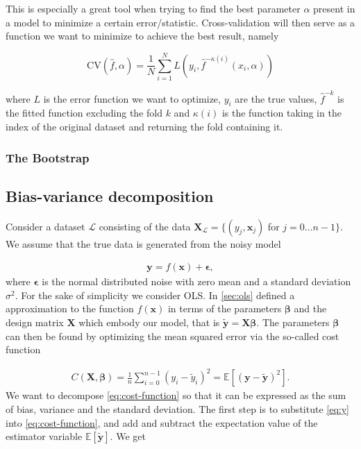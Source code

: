 This is especially a great tool when trying to find the best parameter $\alpha$ present in a model to minimize a certain error/statistic. Cross-validation will then serve as a function we want to minimize to achieve the best result, namely

\begin{equation}
  \text{CV}(\hat f, \alpha) = \frac{1}{N}\sum_{i=1}^N L\left(y_i, \hat f^{-\kappa(i)}(x_i, \alpha)\right)
\end{equation}

where $L$ is the error function we want to optimize, $y_i$ are the true values, $\hat f^{-k}$ is the fitted function excluding the fold $k$ and $\kappa(i)$ is the function taking in the index of the original dataset and returning the fold containing it. 

\subsubsection{The Bootstrap}


\subsection{Bias-variance decomposition}
Consider a dataset \ensuremath{\mathcal{L}} consisting of the data \ensuremath{\mathbf{X}_\mathcal{L}=\{(y_j, \boldsymbol{x}_j)} for \ensuremath{j=0\ldots n-1\}}. We assume that the true data is generated from the noisy model

\begin{align}
    \mathbf{y}=f(\mathbf{x})+\boldsymbol{\epsilon}, 
    \label{eq:y}
\end{align} where \ensuremath{\boldsymbol{\epsilon}} is the normal distributed noise with zero mean and a standard deviation \ensuremath{\sigma^2}. For the sake of simplicity we consider OLS. In \cref{sec:ols} defined a approximation to the function \ensuremath{f(\mathbf{x})} in terms of the parameters \ensuremath{\boldsymbol{\beta}} and the design matrix \ensuremath{\mathbf{X}} which embody our model, that is \ensuremath{\mathbf{\tilde{y}}=\mathbf{X}\boldsymbol{\beta}}. The parameters \ensuremath{\boldsymbol{\beta}} can then be found by optimizing the mean squared error via the so-called cost function

\begin{align}
    C(\mathbf{X}, \boldsymbol{\beta}) = \frac{1}{n}\sum_{i=0}^{n-1}(y_i-\tilde{y}_i)^2=\mathbb{E}\left[(\mathbf{y}-\mathbf{\tilde{y}})^2\right].
    \label{eq:cost-function}
\end{align} We want to decompose \cref{eq:cost-function} so that it can be expressed as the sum of bias, variance and the standard deviation. The first step is to substitute \cref{eq:y} into \cref{eq:cost-function}, and add and subtract the expectation value of the estimator variable \ensuremath{\mathbb{E}[\mathbf{\tilde{y}}]}. We get 

